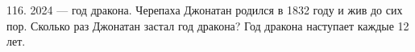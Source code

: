 116. 2024 --- год дракона. Черепаха Джонатан родился в 1832 году и жив до сих пор. Сколько раз Джонатан застал год дракона? Год дракона наступает каждые 12 лет.\\
